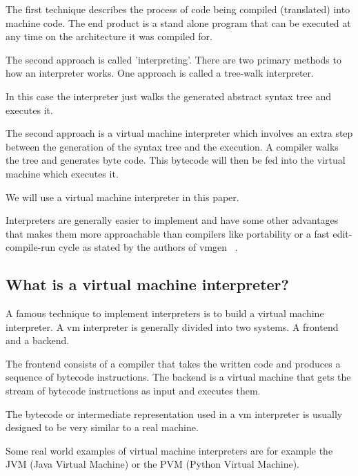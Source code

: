 \documentclass{article}
\begin{document}
The first technique describes the process of code being compiled (translated)
into machine code. The end product is a stand alone program that can be
executed at any time on the architecture it was compiled for.

The second approach is called 'interpreting'. There are two primary methods
to how an interpreter works. One approach is called a tree-walk interpreter.

In this case the interpreter just walks the generated abstract syntax tree
and executes it.

The second approach is a virtual machine interpreter which involves an extra
step between the generation of the syntax tree and the execution. A compiler
walks the tree and generates byte code. This bytecode will then be fed into
the virtual machine which executes it.

We will use a virtual machine interpreter in this paper.

Interpreters are generally easier to implement and have some other advantages
that makes them more approachable than compilers like portability or a fast
edit-compile-run cycle as stated by the authors of vmgen ~\cite{vmgen}. 


\subsection{What is a virtual machine interpreter?}
A famous technique to implement interpreters is to build a virtual machine
interpreter. A vm interpreter is generally divided into two systems. A frontend
and a backend. ~\cite{vmgen}

The frontend consists of a compiler that takes the written code and produces a
sequence of bytecode instructions. The backend is a virtual machine that gets
the stream of bytecode instructions as input and executes them. ~\cite{vmgen}

The bytecode or intermediate representation used in a vm interpreter is usually
designed to be very similar to a real machine. ~\cite{vmgen}

Some real world examples of virtual machine interpreters are for example the
JVM (Java Virtual Machine) or the PVM (Python Virtual Machine).
\end{document}

